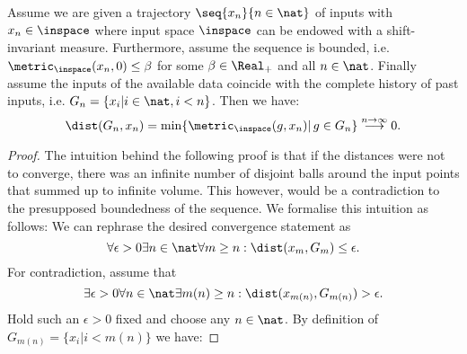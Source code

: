 \begin{lem}
Assume we are given a trajectory $\seq{x_n}{n \in \nat}$ of inputs with $x_n \in \inspace$ where input space $\inspace$ can be endowed with a shift-invariant measure. Furthermore, assume the sequence  is bounded, i.e.  
$\metric_\inspace(x_n,0) \leq \beta$ for some $\beta \in \Real_+$ and all $n \in \nat$.
Finally assume the inputs of the available data coincide with the complete history of past inputs, i.e. $G_n = \{ x_i | i \in \nat, i < n\}$.
Then we have: \[ \dist(G_n,x_n) = \min\{\metric_\inspace(g,x_n) | \, g \in G_n\} \stackrel{n \to \infty}{\longrightarrow} 0.\]
\begin{proof}
The intuition behind the following proof is that if the distances were not to converge, there was an infinite number of disjoint balls around the input points that summed up to infinite volume. This however, would be a contradiction to the presupposed boundedness of the sequence.
We formalise this intuition as follows:
We can rephrase the desired convergence statement as 
\begin{equation}
\forall \epsilon > 0 \exists n \in \nat \forall m \geq n : \dist(x_{m}, G_{m}) \leq \epsilon.
\end{equation} 
For contradiction, assume that
\begin{equation}
\exists \epsilon > 0 \forall n \in \nat \exists m(n) \geq n : \dist(x_{m(n)}, G_{m(n)}) > \epsilon.
\end{equation} 
Hold such an $\epsilon >0$ fixed and choose any $n \in \nat$. 
By definition of $G_{m(n)} =\{ x_i | i < m(n)\} $ we have:


\end{proof}
\end{lem}
